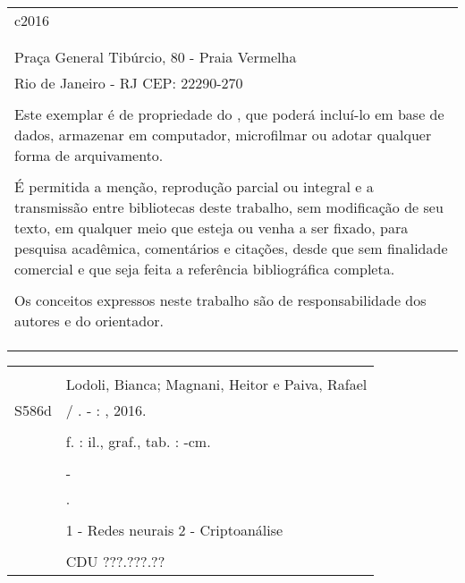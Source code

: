 \begin{fichacatalografica}
	\begin{tabular}{@{\hspace{0cm}}p{14.8cm}}
	c2016\\
	\\
	\imprimirinstituicao\\
	Praça General Tibúrcio, 80 - Praia Vermelha\\
	Rio de Janeiro - RJ \hspace{1.5cm} CEP: 22290-270\\
	\\
	Este exemplar é de propriedade do \imprimirinstituicao, que poderá incluí-lo em base de dados, armazenar em computador, microfilmar ou adotar qualquer forma de arquivamento.\\
	\\
	É permitida a menção, reprodução parcial ou integral e a transmissão entre bibliotecas deste trabalho, sem modificação de seu texto, em qualquer meio que esteja ou venha a ser fixado, para pesquisa acadêmica, comentários e citações, desde que sem finalidade comercial e que seja feita a referência bibliográfica completa.\\
	\\
	Os conceitos expressos neste trabalho são de responsabilidade dos autores e do orientador.\\
	\\
	\\
	\\
	\end{tabular}

	\small
	\begin{center}
	\begin{tabular}{|cp{13cm}|} \hline
		\hspace{1.3cm} & \\
		& Lodoli, Bianca; Magnani, Heitor e Paiva, Rafael \\
		\hspace{0.2cm} S586d & \hspace{0.3cm} \imprimirtitulo{} / \imprimirautor. - \imprimirlocal: \imprimirinstituicao, 2016. \\
		& \\
		& \hspace{0.65cm} \pageref{LastPage}f. : il., graf., tab. : -cm. \\
		& \\
		& \hspace{0.6cm} \imprimirtipotrabalho{} - \imprimirinstituicao \\
		& \hspace{0.6cm} \imprimirorientadorRotulo{} \imprimirorientador.\\
		& \\
		& \hspace{0.6cm} 1 - Redes neurais \hspace{0.1cm} 2 - Criptoanálise\\
		
		& \\ 
		& \hspace{9.75cm} CDU ???.???.?? \\
		\hline
	\end{tabular}
	\end{center}
\end{fichacatalografica}